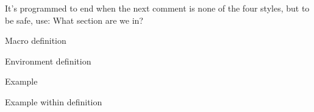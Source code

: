 It's programmed to end when the next comment is none of the four styles, but to be safe, use:
What section are we in?


Macro definition

Environment definition

Example

Example within definition
